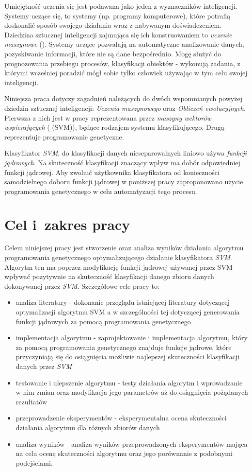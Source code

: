 Umiejętność uczenia się jest podawana jako jeden z wyznaczników inteligencji. Systemy uczące się, to systemy (np. programy komputerowe), które potrafią doskonalić sposób swojego działania wraz z nabywanym doświadczeniem. Dziedzina sztucznej inteligencji zajmująca się ich konstruowaniem to \emph{uczenie maszynowe} (). Systemy uczące pozwalają na automatyczne analizowanie danych, pozyskiwanie informacji, które nie są dane bezpośrednio. Mogę służyć do prognozowania przebiegu procesów, klasyfikacji obiektów - wykonują zadania, z którymi wcześniej poradzić mógł sobie tylko człowiek używając w tym celu swojej inteligencji.

Niniejsza praca dotyczy zagadnień należących do dwóch wspomnianych powyżej dziedzin sztucznej inteligencji: \emph{Uczenia maszynowego} oraz \emph{Obliczeń ewolucyjnych}. Pierwsza z nich jest w pracy reprezentowana przez \emph{maszyny wektorów wspierających} ( (SVM)), będące rodzajem systemu klasyfikującego. Drugą reprezentuje programowanie genetyczne.

Klasyfikator \emph{SVM}, do klasyfikacji danych nieseparowalnych liniowo używa \emph{funkcji jądrowych}. Na skuteczność klasyfikacji znaczący wpływ ma dobór odpowiedniej funkcji jądrowej. Aby zwolnić użytkownika klasyfikatora od konieczności samodzielnego doboru funkcji jądrowej w poniższej pracy zaproponowano użycie programowania genetycznego w celu automatyzacji tego procesu.


\section{Cel i~zakres pracy}
Celem niniejszej pracy jest stworzenie oraz analiza wyników działania algorytmu programowania genetycznego optymalizującego działanie klasyfikatora \emph{SVM}. Algorytm ten ma poprzez modyfikację funkcji jądrowej używanej przez SVM wpływać pozytywnie na skuteczność klasyfikacji danego zbioru danych dokonywanej przez \emph{SVM}. Szczegółowe cele pracy to:
\begin{itemize}
	\item analiza literatury - dokonanie przeglądu istniejącej literatury dotyczącej optymalizacji algorytmu SVM a w szczególności tej dotyczącej generowania funkcji jądrowych za pomocą programowania genetycznego
	\item implementacja algorytmu - zaprojektowanie i implementacja algorytmu, który za pomocą programowania genetycznego znajduje funkcje jądrowe, które przyczyniają się do osiągnięcia możliwie najlepszej skuteczności klasyfikacji danych przez \emph{SVM}
	\item testowanie i ulepszenie algorytmu - testy działania algorytm i wprowadzanie w nim zmian oraz modyfikacja jego parametrów aż do osiągnięcia pożądanych rezultatów
	\item przeprowadzenie eksperymentów - eksperymentalna ocena skuteczności działania algorytmu dla różnych zbiorów danych
	\item analiza wyników - analiza wyników przeprowadzonych eksperymentów mająca na celu ocenę skuteczności algorytmu oraz jego porównanie z podobnymi podejściami.
\end{itemize}

